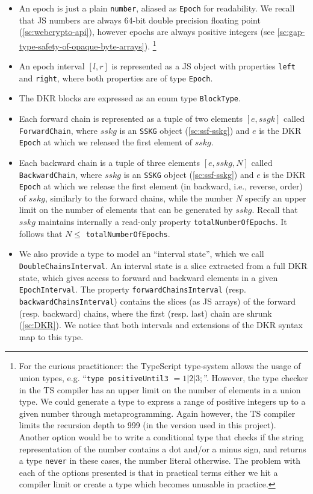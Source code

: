 \begin{itemize}
    \item An epoch is just a plain \texttt{number}, aliased as \texttt{Epoch} for readability. We recall that JS numbers are always 64-bit double precision floating point (\cref{sc:webcrypto-api}), however epochs are always positive integers (see \cref{sc:gap-type-safety-of-opaque-byte-arrays}).
    \footnote{For the curious practitioner: the TypeScript type-system allows the usage of union types, e.g. ``\texttt{type positiveUntil3} $ = 1 | 2 | 3; $''. However, the type checker in the TS compiler has an upper limit on the number of elements in a union type. We could generate a type to express a range of positive integers up to a given number through metaprogramming. Again however, the TS compiler limits the recursion depth to 999 (in the version used in this project). Another option would be to write a conditional type that checks if the string representation of the number contains a dot and/or a minus sign, and returns a type \texttt{never} in these cases, the number literal otherwise. The problem with each of the options presented is that in practical terms either we hit a compiler limit or create a type which becomes unusable in practice.}
    \item An epoch interval $[l, r]$ is represented as a JS object with properties \texttt{left} and \texttt{right}, where both properties are of type \texttt{Epoch}.
    \item The DKR blocks are expressed as an enum type \texttt{BlockType}.
    \item Each forward chain is represented as a tuple of two elements $[e, ssgk]$ called \texttt{ForwardChain}, where $sskg$ is an \texttt{SSKG} object (\cref{sc:ssf-sskg}) and $e$ is the DKR \texttt{Epoch} at which we released the first element of $sskg$.
    \item Each backward chain is a tuple of three elements $[e, sskg, N]$ called \texttt{BackwardChain}, where $sskg$ is an \texttt{SSKG} object (\cref{sc:ssf-sskg}) and $e$ is the DKR \texttt{Epoch} at which we release the first element (in backward, i.e., reverse, order) of $sskg$, similarly to the forward chains, while the number $N$ specify an upper limit on the number of elements that can be generated by $sskg$. Recall that $sskg$ maintains internally a read-only property \texttt{totalNumberOfEpochs}. It follows that $N \leq$ \texttt{totalNumberOfEpochs}.
    \item We also provide a type to model an ``interval state'', which we call \texttt{DoubleChainsInterval}. An interval state is a slice extracted from a full DKR state, which gives access to forward and backward elements in a given \texttt{EpochInterval}. The property \texttt{forwardChainsInterval} (resp. \texttt{backwardChainsInterval}) contains the slices (as JS arrays) of the forward (resp. backward) chains, where the first (resp. last) chain are shrunk (\cref{sc:DKR}). We notice that both intervals and extensions of the DKR syntax map to this type.
\end{itemize}

